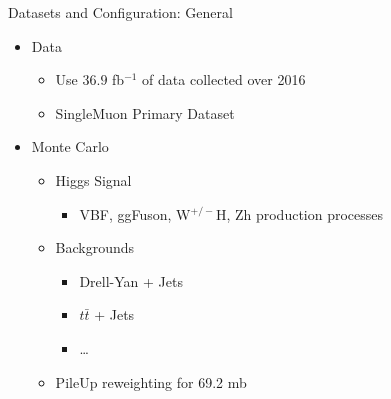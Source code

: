 \documentclass[pdf, 9pt]{beamer}
\begin{document}
  \begin{frame}{Datasets and Configuration: General}
    \begin{itemize}
      \item Data
        \begin{itemize}
          \item Use $36.9$ fb$^{-1}$ of data collected over 2016
          \item SingleMuon Primary Dataset
        \end{itemize}
      \item Monte Carlo
        \begin{itemize}
          \item Higgs Signal
            \begin{itemize}
              \item VBF, ggFuson, W$^{+/-}$H, Zh production processes
            \end{itemize}
          \item Backgrounds
            \begin{itemize}
              \item Drell-Yan + Jets
              \item $t\bar{t}$ + Jets
              \item \dots
            \end{itemize}
          \item PileUp reweighting for 69.2 mb
        \end{itemize}
    \end{itemize}
  \end{frame}
\end{document}
